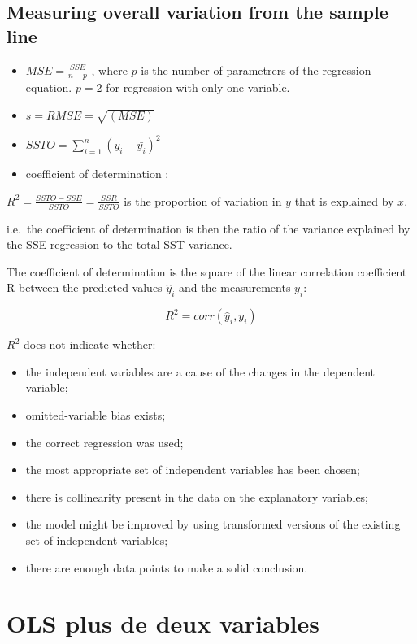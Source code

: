 \documentclass[
]{report}
\providecommand{\tightlist}{%
  \setlength{\itemsep}{0pt}\setlength{\parskip}{0pt}}
\begin{document}
\hypertarget{measuring-overall-variation-from-the-sample-line}{%
\subsection{Measuring overall variation from the sample line}\label{measuring-overall-variation-from-the-sample-line}}

\begin{itemize}
\item
  \(MSE = \frac{SSE}{n-p}\) , where \(p\) is the number of parametrers of the regression equation. \(p=2\) for regression with only one variable.
\item
  \(s = RMSE = \sqrt{(MSE)}\)
\item
  \(SSTO=\sum_{i=1}^n (y_i -\bar{y_i})^2\)
\item
  coefficient of determination :
\end{itemize}

\(R^2 = \frac{SSTO-SSE}{SSTO} = \frac{SSR}{SSTO}\) is the proportion of variation in \(y\) that is explained by \(x\).

i.e.~the coefficient of determination is then the ratio of the variance explained by the SSE regression to the total SST variance.

The coefficient of determination is the square of the linear correlation coefficient R between the predicted values \(\hat{y}_{i}\) and the measurements \(y_i\):

\[R^2=corr(\hat{y}_{i},y_i)\]

\(R^2\) does not indicate whether:

\begin{itemize}
\tightlist
\item
  the independent variables are a cause of the changes in the dependent variable;
\item
  omitted-variable bias exists;
\item
  the correct regression was used;
\item
  the most appropriate set of independent variables has been chosen;
\item
  there is collinearity present in the data on the explanatory variables;
\item
  the model might be improved by using transformed versions of the existing set of independent variables;
\item
  there are enough data points to make a solid conclusion.
\end{itemize}

\hypertarget{ols-plus-de-deux-variables}{%
\section{OLS plus de deux variables}\label{ols-plus-de-deux-variables}}
\end{document}
